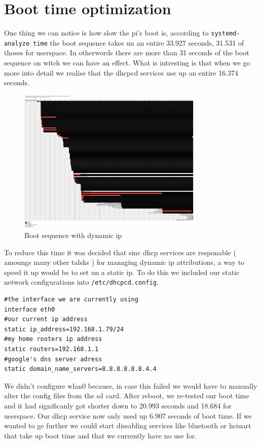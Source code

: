 \documentclass[a4paper,oneside,onecolumn]{article}
\newcommand{\code}[1]{\colorbox{codegray}{\texttt{#1}}}
\begin{document}
\section{Boot time optimization}
One thing we can notice is how slow the pi's boot is, according to \code{systemd-analyze time} the boot sequence takes un an entire 33.927 seconds, 31.531 of thoses for userspace. In otherwords there are more than 31 seconds of the boot sequence on witch we can have an effect. What is intresting is that when we go more into detail we realise that the dhcpcd services use up an entire 16.374 seconds. 
\begin{figure}[!h]
	\centering
	\includegraphics[width=0.8\textwidth,natwidth=610,natheight=642]{Resources/bootdyn.png}
	\caption{Boot sequence with dynamic ip}
\end{figure}
To reduce this time it was decided that sinc dhcp services are responable ( amoungs many other talsks ) for managing dynamic ip attributions, a way to speed it up would be to set un a static ip.\newline
To do this we included our static network configurations into \code{/etc/dhcpcd.config}.
\begin{lstlisting}
#the interface we are currently using
interface eth0
#our current ip address
static ip_address=192.168.1.79/24
#my home rooters ip address
static routers=192.168.1.1
#google's dns server adress
static domain_name_servers=8.8.8.8.8.8.4.4
\end{lstlisting}
We didn't configure wlan0 because, in case this failed we would have to manually alter the config files from the sd card.\newline
After reboot, we re-tested our boot time and it had significanly got shorter down to 20.993 seconds and 18.684 for userspace. Our dhcp service now only used up 6.907 seconds of boot time. If we wanted to ge further we could start dissabling services like bluetooth or hciuart that take up boot time and that we currently have no use for.
\end{document}
